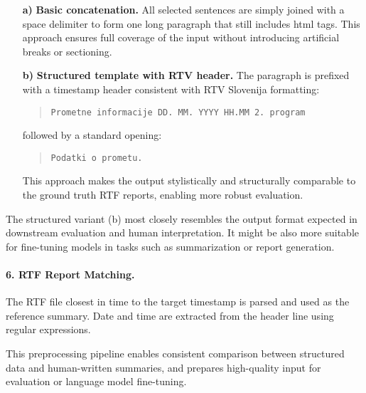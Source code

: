 \begin{itemize}
    \item[\textbf{a)}] \textbf{Basic concatenation.} All selected sentences are simply joined with a space delimiter to form one long paragraph that still includes html tags. This approach ensures full coverage of the input without introducing artificial breaks or sectioning.
    
    \item[\textbf{b)}] \textbf{Structured template with RTV header.} The paragraph is prefixed with a timestamp header consistent with RTV Slovenija formatting:
    \begin{quote}
    \texttt{Prometne informacije \hspace{1em} DD. MM. YYYY \hspace{1em} HH.MM \hspace{1em} 2. program}
    \end{quote}
    followed by a standard opening:
    \begin{quote}
    \texttt{Podatki o prometu.}
    \end{quote}
    This approach makes the output stylistically and structurally comparable to the ground truth RTF reports, enabling more robust evaluation.

\end{itemize}

The structured variant (b) most closely resembles the output format expected in downstream evaluation and human interpretation. It might be also more suitable for fine-tuning models in tasks such as summarization or report generation.

\paragraph{6. RTF Report Matching.}
The RTF file closest in time to the target timestamp is parsed and used as the reference summary. Date and time are extracted from the header line using regular expressions.

This preprocessing pipeline enables consistent comparison between structured data and human-written summaries, and prepares high-quality input for evaluation or language model fine-tuning.

